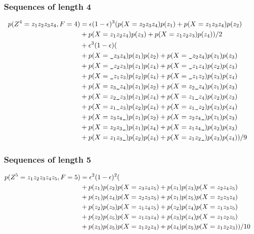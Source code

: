 \subsubsection{Sequences of length 4}

\begin{equation*}
  \begin{split}
    p(Z^4=z_1z_2z_3z_4,F=4) &= \eps(1-\eps)^3 (p(X=z_2z_3z_4)p(z_1)+p(X=z_1z_3z_4)p(z_2)\\
        &+p(X=z_1z_2z_4)p(z_3)+p(X=z_1z_2z_3)p(z_4))/2\\
        &+\eps^3(1-\eps)(\\
        &+ p(X=\s z_3z_4)p(z_1)p(z_2) + p(X=\s z_2z_4)p(z_1)p(z_3)\\
        &+ p(X=\s z_2z_3)p(z_1)p(z_4) + p(X=\s z_1z_4)p(z_2)p(z_3)\\
        &+ p(X=\s z_1z_3)p(z_2)p(z_4) + p(X=\s z_1z_2)p(z_3)p(z_4)\\
        &+ p(X=z_3\s z_4)p(z_1)p(z_2) + p(X=z_2\s z_4)p(z_1)p(z_3)\\
        &+ p(X=z_2\s z_3)p(z_1)p(z_4) + p(X=z_1\s z_4)p(z_2)p(z_3)\\
        &+ p(X=z_1\s z_3)p(z_2)p(z_4) + p(X=z_1\s z_2)p(z_3)p(z_4)\\
        &+ p(X=z_3z_4\s)p(z_1)p(z_2) + p(X=z_2z_4\s)p(z_1)p(z_3)\\
        &+ p(X=z_2z_3\s)p(z_1)p(z_4) + p(X=z_1z_4\s)p(z_2)p(z_3)\\
        &+ p(X=z_1z_3\s)p(z_2)p(z_4) + p(X=z_1z_2\s)p(z_3)p(z_4))/9
  \end{split}
\end{equation*}

\subsubsection{Sequences of length 5}

\begin{equation*}
  \begin{split}
    p(Z^5=z_1z_2z_3z_4z_5,F=5)
        &= \epsilon^2(1-\epsilon)^2(\\
        &+p(z_1)p(z_2)p(X=z_3z_4z_5)+p(z_1)p(z_3)p(X=z_2z_4z_5)\\
        &+p(z_1)p(z_4)p(X=z_2z_3z_5)+p(z_1)p(z_5)p(X=z_2z_3z_4)\\
        &+p(z_2)p(z_3)p(X=z_1z_4z_5)+p(z_2)p(z_4)p(X=z_1z_3z_5)\\
        &+p(z_2)p(z_5)p(X=z_1z_3z_4)+p(z_3)p(z_4)p(X=z_1z_2z_5)\\
        &+p(z_3)p(z_5)p(X=z_1z_2z_4)+p(z_4)p(z_5)p(X=z_1z_2z_3))/10
  \end{split}
\end{equation*}

